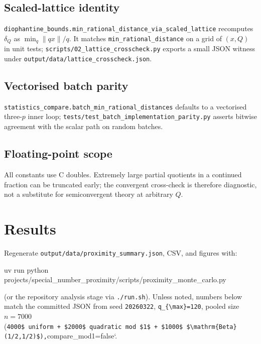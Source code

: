 \documentclass[
]{article}
\newenvironment{Shaded}{}{}
\newcommand{\ExtensionTok}[1]{#1}
\newcommand{\NormalTok}[1]{#1}
\begin{document}
\subsection{Scaled-lattice identity}\label{scaled-lattice-identity}

\texttt{diophantine\_bounds.min\_rational\_distance\_via\_scaled\_lattice}
recomputes \(\delta_Q\) as \(\min_q \|qx\|/q\). It matches
\texttt{min\_rational\_distance} on a grid of \((x,Q)\) in unit tests;
\texttt{scripts/02\_lattice\_crosscheck.py} exports a small JSON witness
under \texttt{output/data/lattice\_crosscheck.json}.

\subsection{Vectorised batch parity}\label{vectorised-batch-parity}

\texttt{statistics\_compare.batch\_min\_rational\_distances} defaults to
a vectorised three-\(p\) inner loop;
\texttt{tests/test\_batch\_implementation\_parity.py} asserts bitwise
agreement with the scalar path on random batches.

\subsection{Floating-point scope}\label{floating-point-scope}

All constants use C doubles. Extremely large partial quotients in a
continued fraction can be truncated early; the convergent cross-check is
therefore diagnostic, not a substitute for semiconvergent theory at
arbitrary \(Q\).

\newpage

\section{Results}\label{results}

Regenerate \texttt{output/data/proximity\_summary.json}, CSV, and
figures with:

\begin{Shaded}
\begin{Highlighting}[]
\ExtensionTok{uv}\NormalTok{ run python projects/special\_number\_proximity/scripts/proximity\_monte\_carlo.py}
\end{Highlighting}
\end{Shaded}

(or the repository analysis stage via \texttt{./run.sh}). Unless noted,
numbers below match the committed JSON from seed \texttt{20260322},
\texttt{q\_\{\textbackslash{}max\}=120}, pooled size \(n=7000\)
(\texttt{4000\$\ uniform\ +\ \$2000\$\ quadratic\ mod\ \$1\$\ +\ \$1000\$\ \$\textbackslash{}mathrm\{Beta\}(1/2,1/2)\$),}compare\_mod1=false`.
\end{document}
